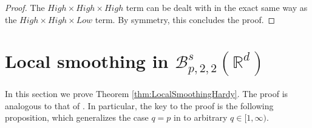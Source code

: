 \documentclass{amsart}
\theoremstyle{definition}
\newcommand {\Rd}{\mathbb{R}^{d}}
\newcommand {\Ba}{\mathcal{B}}
\numberwithin{equation}{section}
\begin{document}
\begin{proof}
The $High \times High \times High$ term can be dealt with in the exact same way as the $High \times High \times Low$ term. By symmetry, this concludes the proof.
\end{proof}









\section{Local smoothing in $\Ba^{s}_{p,2,2}(\Rd)$}
\label{section:LocalSmoothing}

In this section we prove Theorem \ref{thm:LocalSmoothingHardy}. The proof is analogous to that of \cite[Theorem 1.1]{Rozendaal2021LocalSmoothing}. In particular, the key to the proof is the following proposition, which generalizes the case $q=p$ in \cite[Corollary 4.2]{Rozendaal2021LocalSmoothing} to arbitrary $q\in[1,\infty)$.
\end{document}
